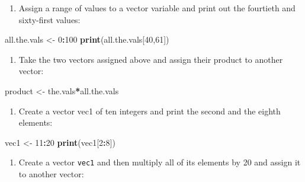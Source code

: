 \documentclass[
]{book}
\newenvironment{Shaded}{\begin{snugshade}}{\end{snugshade}}
\newcommand{\DecValTok}[1]{\textcolor[rgb]{0.00,0.00,0.81}{#1}}
\newcommand{\KeywordTok}[1]{\textcolor[rgb]{0.13,0.29,0.53}{\textbf{#1}}}
\newcommand{\NormalTok}[1]{#1}
\newcommand{\OperatorTok}[1]{\textcolor[rgb]{0.81,0.36,0.00}{\textbf{#1}}}
\newcommand{\StringTok}[1]{\textcolor[rgb]{0.31,0.60,0.02}{#1}}
\providecommand{\tightlist}{%
  \setlength{\itemsep}{0pt}\setlength{\parskip}{0pt}}
\begin{document}
\begin{enumerate}
\def\labelenumi{\arabic{enumi}.}
\setcounter{enumi}{2}
\tightlist
\item
  Assign a range of values to a vector variable and print out the fourtieth and sixty-first values:
\end{enumerate}

\begin{Shaded}
\begin{Highlighting}[]
\NormalTok{all.the.vals \textless{}{-}}\StringTok{ }\DecValTok{0}\OperatorTok{:}\DecValTok{100}
\KeywordTok{print}\NormalTok{(all.the.vals[}\DecValTok{40}\NormalTok{,}\DecValTok{61}\NormalTok{])}
\end{Highlighting}
\end{Shaded}

\begin{enumerate}
\def\labelenumi{\arabic{enumi}.}
\setcounter{enumi}{3}
\tightlist
\item
  Take the two vectors assigned above and assign their product to another vector:
\end{enumerate}

\begin{Shaded}
\begin{Highlighting}[]
\NormalTok{product \textless{}{-}}\StringTok{ }\NormalTok{the.vals}\OperatorTok{*}\NormalTok{all.the.vals}
\end{Highlighting}
\end{Shaded}

\begin{enumerate}
\def\labelenumi{\arabic{enumi}.}
\setcounter{enumi}{4}
\tightlist
\item
  Create a vector vec1 of ten integers and print the second and the eighth elements:
\end{enumerate}

\begin{Shaded}
\begin{Highlighting}[]
\NormalTok{vec1 \textless{}{-}}\StringTok{ }\DecValTok{11}\OperatorTok{:}\DecValTok{20} 
\KeywordTok{print}\NormalTok{(vec1[}\DecValTok{2}\OperatorTok{:}\DecValTok{8}\NormalTok{])}
\end{Highlighting}
\end{Shaded}

\begin{enumerate}
\def\labelenumi{\arabic{enumi}.}
\setcounter{enumi}{5}
\tightlist
\item
  Create a vector \texttt{vec1} and then multiply all of its elements by 20 and assign it to another vector:
\end{enumerate}
\end{document}
